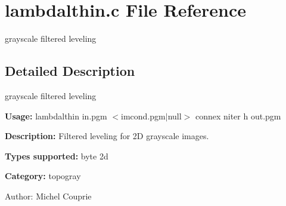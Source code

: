 \section{lambdalthin.c File Reference}
\label{lambdalthin_8c}
grayscale filtered leveling 



\subsection{Detailed Description}
grayscale filtered leveling 

{\bf Usage:} lambdalthin in.pgm $<$imcond.pgm$|$null$>$ connex niter h out.pgm

{\bf Description:} Filtered leveling for 2D grayscale images.

{\bf Types supported:} byte 2d

{\bf Category:} topogray

\begin{Desc}
\item[Author:]Michel Couprie \end{Desc}
